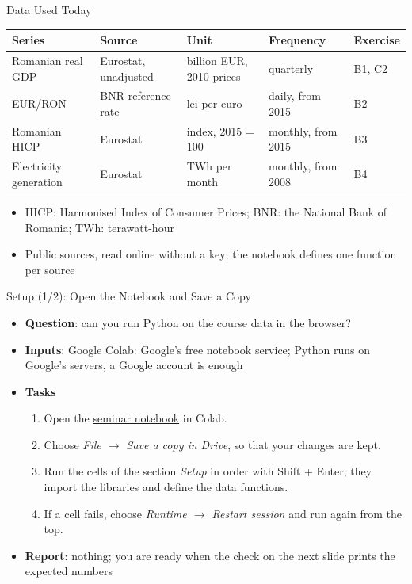 \begin{frame}{Data Used Today}
\itemsize{\footnotesize}
\begin{center}
\footnotesize
\begin{tabular}{>{\raggedright\arraybackslash}p{2.8cm}>{\raggedright\arraybackslash}p{2.8cm}>{\raggedright\arraybackslash}p{2.9cm}>{\raggedright\arraybackslash}p{2.4cm}l}
\toprule
\textbf{Series} & \textbf{Source} & \textbf{Unit} & \textbf{Frequency} & \textbf{Exercise} \\
\midrule
Romanian real GDP & Eurostat, unadjusted & billion EUR, 2010 prices & quarterly & B1, C2 \\
EUR/RON & BNR reference rate & lei per euro & daily, from 2015 & B2 \\
Romanian HICP & Eurostat & index, 2015 = 100 & monthly, from 2015 & B3 \\
Electricity generation & Eurostat & TWh per month & monthly, from 2008 & B4 \\
\bottomrule
\end{tabular}
\end{center}
\begin{itemize}
    \item HICP: Harmonised Index of Consumer Prices; BNR: the National Bank of Romania; TWh: terawatt-hour
    \item Public sources, read online without a key; the notebook defines one function per source
\end{itemize}
\end{frame}

\begin{frame}{Setup (1/2): Open the Notebook and Save a Copy}
\itemsize{\small}
\begin{itemize}
\item \textbf{Question}: can you run Python on the course data in the browser?
\item \textbf{Inputs}: Google Colab: Google's free notebook service; Python runs on Google's servers, a Google account is enough
\item \textbf{Tasks}
\begin{enumerate}
    \item Open the \href{\nb}{seminar notebook} in Colab.
    \item Choose \emph{File $\to$ Save a copy in Drive}, so that your changes are kept.
    \item Run the cells of the section \emph{Setup} in order with Shift + Enter; they import the libraries and define the data functions.
    \item If a cell fails, choose \emph{Runtime $\to$ Restart session} and run again from the top.
\end{enumerate}
\item \textbf{Report}: nothing; you are ready when the check on the next slide prints the expected numbers
\end{itemize}
\end{frame}

